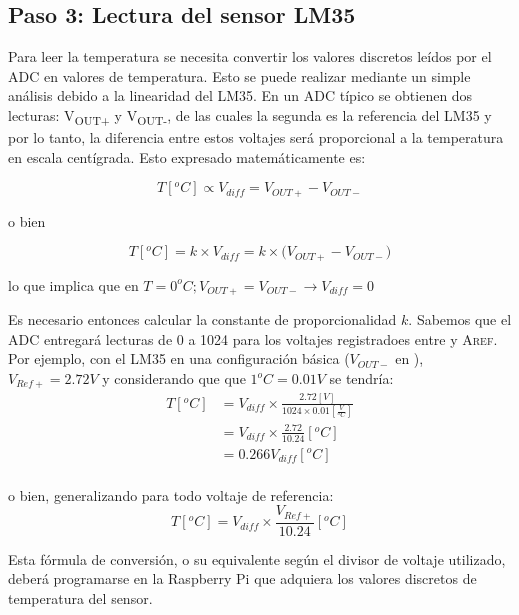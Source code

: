 %
%



\subsection{Paso 3: Lectura del sensor LM35}%
\label{sec:step3}

Para leer la temperatura se necesita convertir los valores discretos leídos por el ADC en valores de temperatura.
Esto se puede realizar mediante un simple análisis debido a la linearidad del LM35.
En un ADC típico se obtienen dos lecturas: V\textsubscript{OUT+} y V\textsubscript{OUT-}, de las cuales la segunda es la referencia del LM35 y por lo tanto, la diferencia entre estos voltajes será proporcional a la temperatura en escala centígrada.
Esto expresado matemáticamente es:

\begin{equation*}
	T[^{o}C] \propto V_{diff} = V_{OUT+}-V_{OUT-}
\end{equation*}

\noindent o bien

\begin{equation*}
	T[^{o}C] = k \times V_{diff} = k \times \big( V_{OUT+}-V_{OUT-} \big)
\end{equation*}

\noindent lo que implica que en $T = 0^{o}C; V_{OUT+}=V_{OUT-} \rightarrow V_{diff} = 0$

\medskip
Es necesario entonces calcular la constante de proporcionalidad $k$.
Sabemos que el ADC entregará lecturas de 0 a 1024 para los voltajes registradoes entre \GND y \textsc{Aref}.
Por ejemplo, con el LM35 en una configuración básica ($V_{OUT-}$ en \GND), $V_{Ref+} = 2.72V$ y considerando que que $1^{o}C = 0.01V$ se tendría:
\begin{align*}
	T[^{o}C] &= V_{diff} \times \frac{2.72[V]}{ 1024 \times 0.01[\tfrac{V}{^{o}C}] }  \\
	         &= V_{diff} \times \frac{2.72}{ 10.24 }[^{o}C]  \\
	         &= 0.266 V_{diff}[^{o}C]  \\
\end{align*}

\noindent o bien, generalizando para todo voltaje de referencia:
\begin{equation*}
	T[^{o}C] = V_{diff} \times \frac{V_{Ref+}}{ 10.24 }[^{o}C]
\end{equation*}

Esta fórmula de conversión, o su equivalente según el divisor de voltaje utilizado, deberá programarse en la Raspberry Pi que adquiera los valores discretos de temperatura del sensor.
